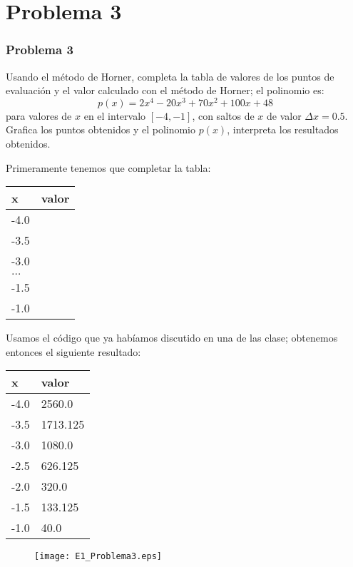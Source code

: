 \section{Problema 3}
\begin{frame}
\frametitle{Problema 3}
Usando el m\'{e}todo de Horner, completa la tabla de valores de los puntos de evaluaci\'{o}n y el valor calculado con el m\'{e}todo de Horner; el polinomio es:
\[p(x)= 2x^{4} - 20x^{3} + 70x^{2}+ 100x+48 \]
para valores de $x$ en el intervalo $[-4,-1]$, con saltos de $x$ de valor $\Delta x = 0.5$.
\medskip
\\
Grafica los puntos obtenidos y el polinomio $p(x)$, interpreta los resultados obtenidos.
\end{frame}
\begin{frame}
Primeramente tenemos que completar la tabla:
\begin{center}
	\begin{tabular}{l | l}
	x & valor \\ \hline
	-4.0 & \\ \hline
	-3.5 & \\ \hline
	-3.0 & \\ \hline
	$\ldots$ & \\ \hline
	-1.5 & \\ \hline
	-1.0 & 
	\end{tabular}
\end{center}
\end{frame}
\begin{frame}
Usamos el c\'{o}digo que ya hab\'{i}amos discutido en una de las clase; obtenemos entonces el siguiente resultado:
\begin{center}
	\begin{tabular}{l | l}
	x & valor \\ \hline
	-4.0 & 2560.0 \\ \hline
	-3.5 & 1713.125 \\ \hline
	-3.0 & 1080.0 \\ \hline
	-2.5 & 626.125 \\ \hline
	-2.0 & 320.0 \\ \hline
	-1.5 & 133.125 \\ \hline
	-1.0 & 40.0
	\end{tabular}
\end{center}
\end{frame}
\begin{frame}
\begin{figure}
	\centering
	\texttt{[image: E1\_Problema3.eps]} 
\end{figure}
\end{frame}

